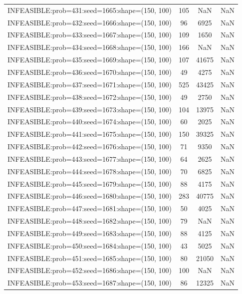 \begin{longtable}{lccc}
INFEASIBLE:prob=431:seed=1665:shape=(150, 100) &   105 &   NaN &    NaN \\
INFEASIBLE:prob=432:seed=1666:shape=(150, 100) &    96 &  6925 &    NaN \\
INFEASIBLE:prob=433:seed=1667:shape=(150, 100) &   109 &  1650 &    NaN \\
INFEASIBLE:prob=434:seed=1668:shape=(150, 100) &   166 &   NaN &    NaN \\
INFEASIBLE:prob=435:seed=1669:shape=(150, 100) &   107 & 41675 &    NaN \\
INFEASIBLE:prob=436:seed=1670:shape=(150, 100) &    49 &  4275 &    NaN \\
INFEASIBLE:prob=437:seed=1671:shape=(150, 100) &   525 & 43425 &    NaN \\
INFEASIBLE:prob=438:seed=1672:shape=(150, 100) &    49 &  2750 &    NaN \\
INFEASIBLE:prob=439:seed=1673:shape=(150, 100) &   104 & 13975 &    NaN \\
INFEASIBLE:prob=440:seed=1674:shape=(150, 100) &    60 &  2025 &    NaN \\
INFEASIBLE:prob=441:seed=1675:shape=(150, 100) &   150 & 39325 &    NaN \\
INFEASIBLE:prob=442:seed=1676:shape=(150, 100) &    71 &  9350 &    NaN \\
INFEASIBLE:prob=443:seed=1677:shape=(150, 100) &    64 &  2625 &    NaN \\
INFEASIBLE:prob=444:seed=1678:shape=(150, 100) &    70 &  6825 &    NaN \\
INFEASIBLE:prob=445:seed=1679:shape=(150, 100) &    88 &  4175 &    NaN \\
INFEASIBLE:prob=446:seed=1680:shape=(150, 100) &   283 & 40775 &    NaN \\
INFEASIBLE:prob=447:seed=1681:shape=(150, 100) &    50 &  4025 &    NaN \\
INFEASIBLE:prob=448:seed=1682:shape=(150, 100) &    79 &   NaN &    NaN \\
INFEASIBLE:prob=449:seed=1683:shape=(150, 100) &    88 &  4125 &    NaN \\
INFEASIBLE:prob=450:seed=1684:shape=(150, 100) &    43 &  5025 &    NaN \\
INFEASIBLE:prob=451:seed=1685:shape=(150, 100) &    80 & 21050 &    NaN \\
INFEASIBLE:prob=452:seed=1686:shape=(150, 100) &   100 &   NaN &    NaN \\
INFEASIBLE:prob=453:seed=1687:shape=(150, 100) &    86 & 12325 &    NaN \\

\end{longtable}

